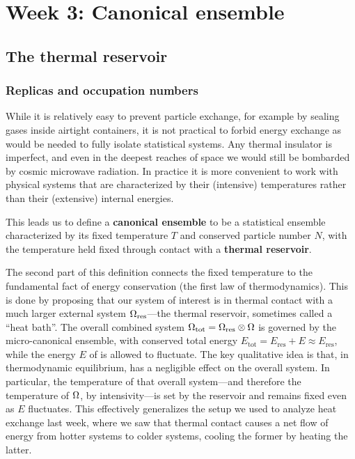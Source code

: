 \renewcommand{\thisweek}{MATH327 Week 3}
\renewcommand{\moddate}{Last modified 4 Mar.~2021}
\setcounter{section}{3}
\setcounter{subsection}{0}
{}
\section*{Week 3: Canonical ensemble}
\subsection{\label{sec:reservoir}The thermal reservoir}
\subsubsection{\label{sec:replicas}Replicas and occupation numbers}
While it is relatively easy to prevent particle exchange, for example by sealing gases inside airtight containers, it is not practical to forbid energy exchange as would be needed to fully isolate statistical systems.
Any thermal insulator is imperfect, and even in the deepest reaches of space we would still be bombarded by cosmic microwave radiation.
In practice it is more convenient to work with physical systems that are characterized by their (intensive) temperatures rather than their (extensive) internal energies.

\begin{shaded}
  This leads us to define a \textbf{canonical ensemble} to be a statistical ensemble characterized by its fixed temperature $T$ and conserved particle number $N$, with the temperature held fixed through contact with a \textbf{thermal reservoir}.
\end{shaded}

The second part of this definition connects the fixed temperature to the fundamental fact of energy conservation (the first law of thermodynamics).
This is done by proposing that our system of interest \Om is in thermal contact with a much larger external system $\Omega_{\text{res}}$---the thermal reservoir, sometimes called a ``heat bath''.
The overall combined system $\Omega_{\text{tot}} = \Omega_{\text{res}} \otimes \Omega$ is governed by the micro-canonical ensemble, with conserved total energy $E_{\text{tot}} = E_{\text{res}} + E \approx E_{\text{res}}$, while the energy $E$ of \Om is allowed to fluctuate.
The key qualitative idea is that, in thermodynamic equilibrium, \Om has a negligible effect on the overall system.
In particular, the temperature of that overall system---and therefore the temperature of $\Omega$, by intensivity---is set by the reservoir and remains fixed even as $E$ fluctuates.
This effectively generalizes the setup we used to analyze heat exchange last week, where we saw that thermal contact causes a net flow of energy from hotter systems to colder systems, cooling the former by heating the latter.

